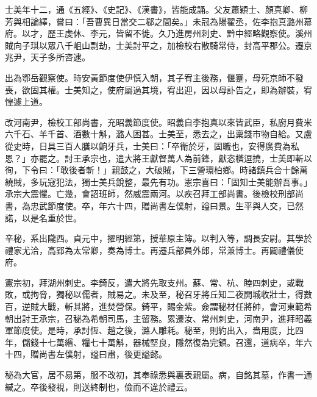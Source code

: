 \begin{pinyinscope}
 士美年十二，通《五經》、《史記》、《漢書》，皆能成誦。父友蕭穎士、顏真卿、柳芳與相論繹，嘗曰：「吾曹異日當交二郗之間矣。」未冠為陽翟丞，佐李抱真潞州幕府。以才，歷王虔休、李元，皆留不徙。久乃進房州刺史、黔中經略觀察使。溪州賊向子琪以眾八千岨山剽劫，士美討平之，加檢校右散騎常侍，封高平郡公。遷京兆尹，天子多所咨逮。



 出為鄂岳觀察使。時安黃節度使伊慎入朝，其子宥主後務，偃蹇，母死京師不發喪，欲固其權。士美知之，使府屬過其境，宥出迎，因以母訃告之，即為辦裝，宥惶遽上道。



 改河南尹，檢校工部尚書，充昭義節度使。昭義自李抱真以來皆武臣，私廚月費米六千石、羊千首、酒數十斛，潞人困甚。士美至，悉去之，出稟錢市物自給。又盧從史時，日具三百人膳以餉牙兵，士美曰：「卒衛於牙，固職也，安得廣費為私恩？」亦罷之。討王承宗也，遣大將王獻督萬人為前鋒，獻恣橫逗撓，士美即斬以徇，下令曰：「敢後者斬！」親鼓之，大破賊，下三營環柏鄉。時諸鎮兵合十餘萬繞賊，多玩寇犯法，獨士美兵銳整，最先有功。憲宗喜曰：「固知士美能辦吾事。」承宗大震懼。亡幾，會詔班師，然威震兩河。以疾召拜工部尚書。後檢校刑部尚書，為忠武節度使。卒，年六十四，贈尚書左僕射，謚曰景。生平與人交，已然諾，以是名重於世。



 辛秘，系出隴西。貞元中，擢明經第，授華原主簿。以判入等，調長安尉。其學於禮家尤洽，高郢為太常卿，奏為博士。再遷兵部員外郎，常兼博士。再闢禮儀使府。



 憲宗初，拜湖州刺史。李錡反，遣大將先取支州。蘇、常、杭、睦四刺史，或戰敗，或拘脅，獨秘以儒者，賊易之。未及至，秘召牙將丘知二夜開城收壯士，得數百，逆賊大戰，斬其將，進焚營保。錡平，賜金紫。僉謂秘材任將帥，會河東範希朝出討王承宗，召秘為希朝司馬，主留務。累遷汝、常州刺史，河南尹，進拜昭義軍節度使。是時，承討恆、趙之後，潞人雕耗。秘至，則約出入，嗇用度，比四年，儲錢十七萬緡、糧七十萬斛，器械堅良，隱然復為完鎮。召還，道病卒，年六十四，贈尚書左僕射，謚曰肅，後更謚懿。



 秘為大官，居不易第，服不改初，其奉祿悉與裏表親屬。病，自銘其墓，作書一通緘之。卒後發視，則送終制也，儉而不違於禮云。



\end{pinyinscope}